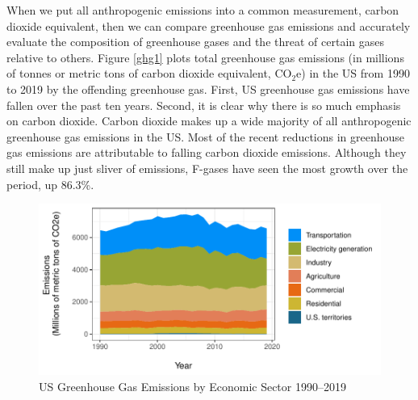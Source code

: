 When we put all anthropogenic emissions into a common measurement, carbon dioxide equivalent, then we can compare greenhouse gas emissions and accurately evaluate the composition of greenhouse gases and the threat of certain gases relative to others. Figure \ref{ghg1} plots total greenhouse gas emissions (in millions of tonnes or metric tons of carbon dioxide equivalent, CO$_2$e) in the US from 1990 to 2019 by the offending greenhouse gas. First, US greenhouse gas emissions have fallen over the past ten years. Second, it is clear why there is so much emphasis on carbon dioxide. Carbon dioxide makes up a wide majority of all anthropogenic greenhouse gas emissions in the US. Most of the recent reductions in greenhouse gas emissions are attributable to falling carbon dioxide emissions. Although they still make up just sliver of emissions, F-gases have seen the most growth over the period, up 86.3\%. 

\begin{figure}
\caption{US Greenhouse Gas Emissions by Economic Sector 1990--2019 \label{ghgeconomic}}
\centering
\includegraphics[width=\textwidth]{figures/chapter1_figures/ghg_economic.pdf}
\end{figure}


